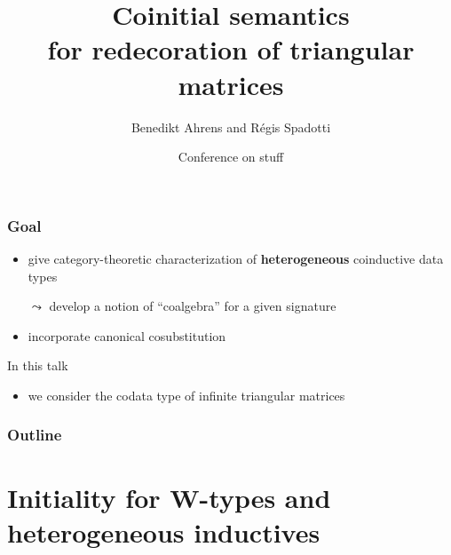 \documentclass[
serif,
mathsans,
]
{beamer}
\title[Coinitial semantics for redecoration]{Coinitial semantics \\ for redecoration of triangular matrices}
\author{Benedikt Ahrens and R\'egis Spadotti}
\date[put date here]{Conference on stuff}
\institute[IRIT] %
{%
  Institut de Recherche en Informatique de Toulouse\\
   Universit\'e Paul Sabatier\\ ~ \\
}
\newcommand{\fat}[1]{\textbf{#1}}
\begin{document}
\begin{frame}
 \titlepage
\end{frame}


\begin{frame}
 \frametitle{Goal}
 
   \begin{itemize}\setlength{\itemsep}{1em}
    \item give category-theoretic characterization of \fat{heterogeneous} coinductive data types
    \item [$\leadsto$] develop a notion of \enquote{coalgebra} for a given signature
    \item incorporate canonical cosubstitution
   \end{itemize}

  \begin{block}{In this talk}
   \begin{itemize}
    \item we consider the codata type of infinite triangular matrices
   \end{itemize}
  \end{block}

 
\end{frame}


\begin{frame}
 \frametitle{Outline}
 \tableofcontents
\end{frame}


\section{Initiality for W-types and heterogeneous inductives}
\end{document}
